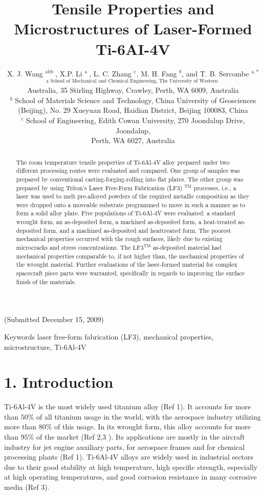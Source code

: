 \documentclass[10pt]{article}
\title{Tensile Properties and Microstructures of Laser-Formed Ti-6AI-4V }
\author{X. J. Wang ${ }^{\text {abb }}$, X.P. Li ${ }^{\text {a }}$, L. C. Zhang ${ }^{\mathrm{c}}$, M. H. Fang ${ }^{b}$, and T. B. Sercombe ${ }^{\mathrm{a}, *}$\\
${ }^{\text {a School of Mechanical and Chemical Engineering, The University of Western }}$\\
Australia, 35 Stirling Highway, Crawley, Perth, WA 6009, Australia\\
${ }^{b}$ School of Materials Science and Technology, China University of Geosciences\\
(Beijing), No. 29 Xueyuan Road, Haidian District, Beijing 100083, China\\
${ }^{c}$ School of Engineering, Edith Cowan University, 270 Joondalup Drive, Joondalup,\\
Perth, WA 6027, Australia}
\date{}
\begin{document}
\maketitle
(Submitted December 15, 2009)

\begin{abstract}
The room temperature tensile properties of Ti-6Al-4V alloy prepared under two different processing routes were evaluated and compared. One group of samples was prepared by conventional casting-forging-rolling into flat plates. The other group was prepared by using Triton's Laser Free-Form Fabrication (LF3) ${ }^{\mathrm{TM}}$ processes, i.e., a laser was used to melt pre-alloyed powders of the required metallic composition as they were dropped onto a moveable substrate programmed to move in such a manner as to form a solid alloy plate. Five populations of Ti-6Al-4V were evaluated: a standard wrought form, an as-deposited form, a machined as-deposited form, a heat-treated as-deposited form, and a machined as-deposited and heattreated form. The poorest mechanical properties occurred with the rough surfaces, likely due to existing microcracks and stress concentrations. The $\mathrm{LF3}^{\mathrm{TM}}$ as-deposited material had mechanical properties comparable to, if not higher than, the mechanical properties of the wrought material. Further evaluations of the laser-formed material for complex spacecraft piece parts were warranted, specifically in regards to improving the surface finish of the materials.
\end{abstract}

Keywords laser free-form fabrication (LF3), mechanical properties, microstructure, Ti-6Al-4V

\section*{1. Introduction}
Ti-6Al-4V is the most widely used titanium alloy (Ref 1). It accounts for more than $50 \%$ of all titanium usage in the world, with the aerospace industry utilizing more than $80 \%$ of this usage. In its wrought form, this alloy accounts for more than $95 \%$ of the market (Ref 2,3 ). Its applications are mostly in the aircraft industry for jet engine auxiliary parts, for aerospace frames and for chemical processing plants (Ref 1). Ti-6Al-4V alloys are widely used in industrial sectors due to their good stability at high temperature, high specific strength, especially at high operating temperatures, and good corrosion resistance in many corrosive media (Ref 3).
\end{document}
